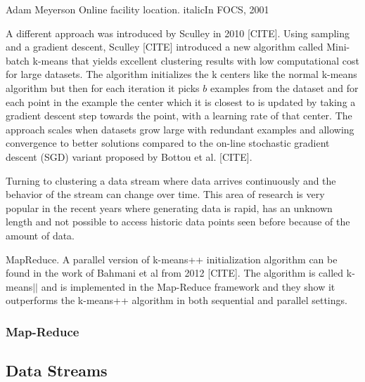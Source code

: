 Adam Meyerson 
Online facility location. italic{In FOCS}, 2001


A different approach was introduced by Sculley in 2010 [CITE]. Using sampling and a gradient descent, Sculley [CITE] introduced a new algorithm called Mini-batch k-means that yields excellent clustering results with low computational cost for large datasets. The algorithm initializes the k centers like the normal k-means algorithm but then for each iteration it picks $b$ examples from the dataset and for each point in the example the center which it is closest to is updated by taking a gradient descent step towards the point, with a learning rate of that center. The approach scales when datasets grow large with redundant examples and allowing convergence to better solutions compared to the on-line stochastic gradient descent (SGD) variant proposed by Bottou et al. [CITE].

Turning to clustering a data stream where data arrives continuously and the behavior of the stream can change over time. This area of research is very popular in the recent years where generating data is rapid, has an unknown length and not possible to access historic data points seen before because of the amount of data. 

MapReduce.
A parallel version of k-means++ initialization algorithm can be found in the work of Bahmani et al from 2012 [CITE]. The algorithm is called k-means$||$ and is implemented in the Map-Reduce framework and they show it outperforms the k-means++ algorithm in both sequential and parallel settings.




\subsubsection{Map-Reduce}

\subsection{Data Streams}

